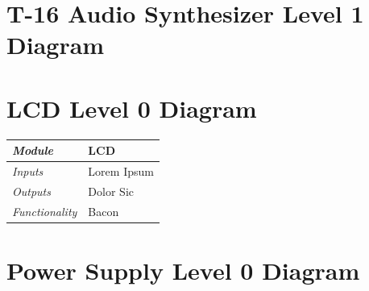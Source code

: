 \documentclass{article}
\begin{document}
\section{T-16 Audio Synthesizer Level 1 Diagram}


\section{LCD Level 0 Diagram}

\begin{tabular}{|p{1in}|p{5in}|}
\hline
\emph{Module} & LCD \\
\hline
\emph{Inputs}& Lorem Ipsum\\
\hline
\emph{Outputs}& Dolor Sic \\ 
\hline
\emph{Functionality}& Bacon\\
\hline
\end{tabular}

\section{Power Supply Level 0 Diagram}
\end{document}

